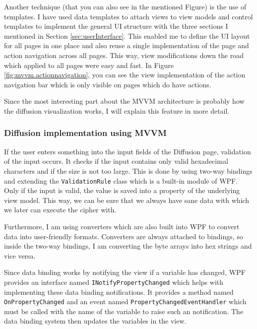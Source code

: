 Another technique (that you can also see in the mentioned Figure) is the use of templates. I have used data templates to attach views to view models and control templates to implement the general UI structure with the three sections I mentioned in Section \ref{sec:userInterface}. This enabled me to define the UI layout for all pages in one place and also reuse a single implementation of the page and action navigation across all pages. This way, view modifications down the road which applied to all pages were easy and fast. In Figure \ref{fig:mvvm.actionnavigation}, you can see the view implementation of the action navigation bar which is only visible on pages which do have actions.

Since the most interesting part about the MVVM architecture is probably how the diffusion visualization works, I will explain this feature in more detail.

\subsubsection{Diffusion implementation using MVVM}

If the user enters something into the input fields of the Diffusion page, validation of the input occurs. It checks if the input contains only valid hexadecimal characters and if the size is not too large. This is done by using two-way bindings and extending the \texttt{ValidationRule} class which is a built-in module of WPF. Only if the input is valid, the value is saved into a property of the underlying view model. This way, we can be sure that we always have sane data with which we later can execute the cipher with.

Furthermore, I am using converters which are also built into WPF to convert data into user-friendly formats. Converters are always attached to bindings, so inside the two-way bindings, I am converting the byte arrays into hex strings and vice versa.

Since data binding works by notifying the view if a variable has changed, WPF provides an interface named \texttt{INotifyPropertyChanged} which helps with implementing these data binding notifications. It provides a method named \texttt{OnPropertyChanged} and  an event named \texttt{PropertyChangedEventHandler} which must be called with the name of the variable to raise such an notification. The data binding system then updates the variables in the view.

